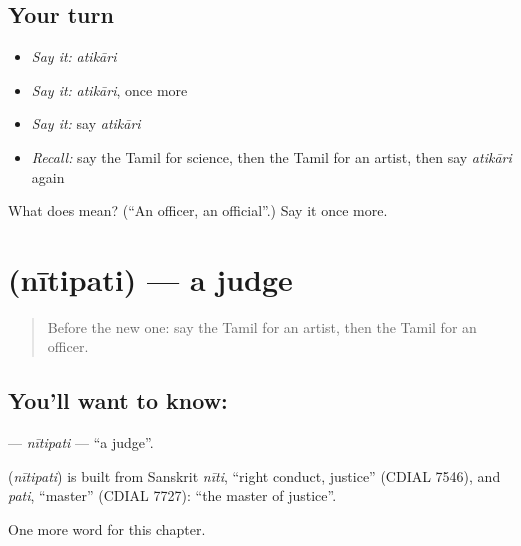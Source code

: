 \subsection*{Your turn}
\begin{itemize}
\raggedright
  \item \emph{Say it:} \emph{atikāri}
  \item \emph{Say it:} \emph{atikāri}, once more
  \item \emph{Say it:} say \emph{atikāri}
  \item \emph{Recall:} say the Tamil for science, then the Tamil for an artist, then say \emph{atikāri} again
\end{itemize}

\begin{tcolorbox}[breakable,colback=teal!4,colframe=teal!35!black,title={Before you move on}]
What does  mean? (\textquotedblleft{}An officer, an official\textquotedblright{}.) Say it once more.
\end{tcolorbox}
\section[\texorpdfstring{\ta{நீதிபதி} (nītipati)}{நீதிபதி (nītipati)}]{ (nītipati) — a judge}

\label{lesson:TA-C253-nitipati}



\begin{quote}
Before the new one: say the Tamil for an artist, then the Tamil for an officer.
\end{quote}

\subsection*{You'll want to know: }
\textbf{} — \emph{nītipati} — \textquotedblleft{}a judge\textquotedblright{}.

\begin{cousinweb}
\textbf{} (\emph{nītipati}) is built from Sanskrit \emph{nīti}, \textquotedblleft{}right conduct, justice\textquotedblright{} (CDIAL 7546), and \emph{pati}, \textquotedblleft{}master\textquotedblright{} (CDIAL 7727): \textquotedblleft{}the master of justice\textquotedblright{}.
\end{cousinweb}

\begin{grammarlens}[title={What you've built}]
One more word for this chapter.
\end{grammarlens}

